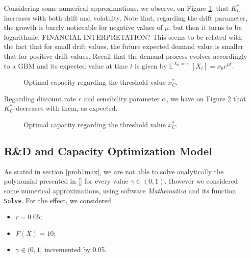 Considering some numerical approximations, we observe, on Figure \ref{fig:k1}, that $K^*_C$ increases with both drift and volatility. Note that, regarding the drift parameter, the growth is barely noticeable for negative values of $\mu$, but then it turns to be logarithmic. FINANCIAL INTERPRETATION? This seems to be related with the fact that for small drift values, the future expected demand value is smaller that for positive drift values. Recall that the demand process evolves accordingly to a GBM and its expected value at time $t$ is given by $\mathds{E}^{X_0=x_0} [X_t]=x_0 e^{\mu t}$.

\begin{figure}[!htb]
	\begin{subfigmatrix}{2}
	\end{subfigmatrix}
	\caption{Optimal capacity regarding the threshold value $x^*_C$.}
	\label{fig:k1}
\end{figure}

Regarding discount rate $r$ and sensibility parameter $\alpha$, we have on Figure \ref{fig:k2} that $K^*_C$ decreases with them, as expected.
 
\begin{figure}[!htb]
	\begin{subfigmatrix}{2}
	\end{subfigmatrix}
	\caption{Optimal capacity regarding the threshold value $x^*_C$.}
	\label{fig:k2}
\end{figure}









\subsection{R\&D and Capacity Optimization Model}
\label{subsec:RDcap1}

As stated in section \ref{prob1max}, we are not able to solve analytically the polynomial presented in \eqref{} for every value $\gamma \in (0,1)$. However we considered some numerical approximations, using software \textit{Mathematica} and its function \texttt{Solve}. For the effect, we considered 
\begin{itemize}
	\item $r=0.05$;
	\item $F(X)=10$;
	\item $\gamma \in (0,1]$ incremented by 0.05.
\end{itemize}

